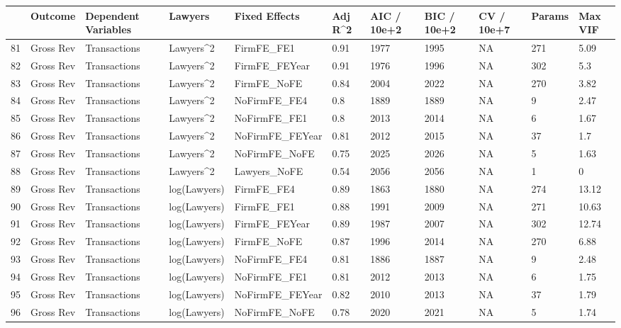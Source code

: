 \documentclass{article}
\begin{document}
\begin{table}[H]
\centering
\begin{tabular}{rllllllllll}
  \hline
 & Outcome & Dependent Variables & Lawyers & Fixed Effects & Adj R^2 & AIC / 10e+2 & BIC / 10e+2 & CV / 10e+7 & Params & Max VIF \\ 
  \hline
81 & Gross Rev & Transactions & Lawyers^2 & FirmFE\_FE1 & 0.91 & 1977 & 1995 & NA & 271 & 5.09 \\ 
  82 & Gross Rev & Transactions & Lawyers^2 & FirmFE\_FEYear & 0.91 & 1976 & 1996 & NA & 302 & 5.3 \\ 
  83 & Gross Rev & Transactions & Lawyers^2 & FirmFE\_NoFE & 0.84 & 2004 & 2022 & NA & 270 & 3.82 \\ 
  84 & Gross Rev & Transactions & Lawyers^2 & NoFirmFE\_FE4 & 0.8 & 1889 & 1889 & NA & 9 & 2.47 \\ 
  85 & Gross Rev & Transactions & Lawyers^2 & NoFirmFE\_FE1 & 0.8 & 2013 & 2014 & NA & 6 & 1.67 \\ 
  86 & Gross Rev & Transactions & Lawyers^2 & NoFirmFE\_FEYear & 0.81 & 2012 & 2015 & NA & 37 & 1.7 \\ 
  87 & Gross Rev & Transactions & Lawyers^2 & NoFirmFE\_NoFE & 0.75 & 2025 & 2026 & NA & 5 & 1.63 \\ 
  88 & Gross Rev & Transactions & Lawyers^2 & Lawyers\_NoFE & 0.54 & 2056 & 2056 & NA & 1 & 0 \\ 
  89 & Gross Rev & Transactions & log(Lawyers) & FirmFE\_FE4 & 0.89 & 1863 & 1880 & NA & 274 & 13.12 \\ 
  90 & Gross Rev & Transactions & log(Lawyers) & FirmFE\_FE1 & 0.88 & 1991 & 2009 & NA & 271 & 10.63 \\ 
  91 & Gross Rev & Transactions & log(Lawyers) & FirmFE\_FEYear & 0.89 & 1987 & 2007 & NA & 302 & 12.74 \\ 
  92 & Gross Rev & Transactions & log(Lawyers) & FirmFE\_NoFE & 0.87 & 1996 & 2014 & NA & 270 & 6.88 \\ 
  93 & Gross Rev & Transactions & log(Lawyers) & NoFirmFE\_FE4 & 0.81 & 1886 & 1887 & NA & 9 & 2.48 \\ 
  94 & Gross Rev & Transactions & log(Lawyers) & NoFirmFE\_FE1 & 0.81 & 2012 & 2013 & NA & 6 & 1.75 \\ 
  95 & Gross Rev & Transactions & log(Lawyers) & NoFirmFE\_FEYear & 0.82 & 2010 & 2013 & NA & 37 & 1.79 \\ 
  96 & Gross Rev & Transactions & log(Lawyers) & NoFirmFE\_NoFE & 0.78 & 2020 & 2021 & NA & 5 & 1.74 \\ 

\end{tabular}
\end{table}
\end{document}
